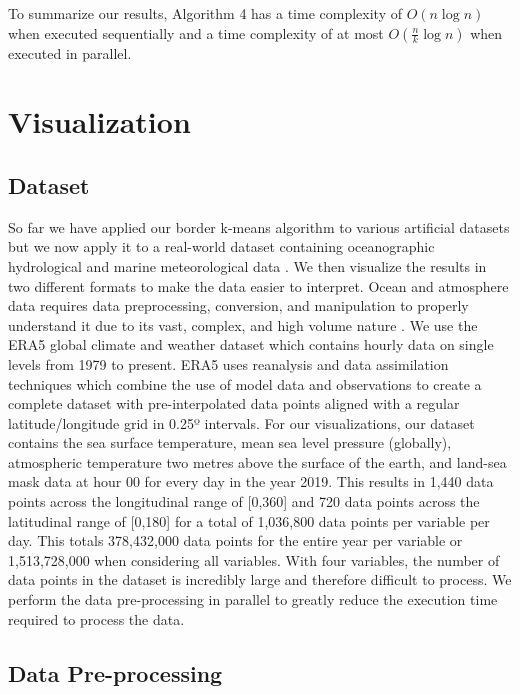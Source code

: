 \documentclass[conference,compsoc]{IEEEtran}
\begin{document}
To summarize our results, Algorithm 4 has a time complexity of $O(n \log n)$ when executed sequentially and a time complexity of at most $O(\frac{n}{k} \log n)$ when executed in parallel.

\section{Visualization}

\subsection{Dataset}

So far we have applied our border k-means algorithm to various artificial datasets but we now apply it to a real-world dataset containing oceanographic hydrological and marine meteorological data \cite{b4}. We then visualize the results in two different formats to make the data easier to interpret. Ocean and atmosphere data requires data preprocessing, conversion, and manipulation to properly understand it due to its vast, complex, and high volume nature \cite{b4}. We use the ERA5 global climate and weather dataset which contains hourly data on single levels from 1979 to present. ERA5 uses reanalysis and data assimilation techniques which combine the use of model data and observations to create a complete dataset with pre-interpolated data points aligned with a regular latitude/longitude grid in 0.25º intervals. For our visualizations, our dataset contains the sea surface temperature, mean sea level pressure (globally), atmospheric temperature two metres above the surface of the earth, and land-sea mask data at hour 00 for every day in the year 2019. This results in 1,440 data points across the longitudinal range of [0,360] and 720 data points across the latitudinal range of [0,180] for a total of 1,036,800 data points per variable per day. This totals 378,432,000 data points for the entire year per variable or 1,513,728,000 when considering all variables. With four variables, the number of data points in the dataset is incredibly large and therefore difficult to process. We perform the data pre-processing in parallel to greatly reduce the execution time required to process the data.

\subsection{Data Pre-processing}
\end{document}
